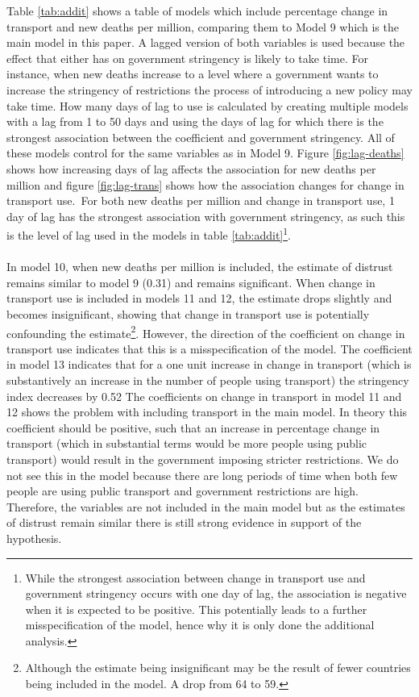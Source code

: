 \documentclass[
  12pt,
]{article}
\begin{document}
Table \ref{tab:addit} shows a table of models which include percentage change in transport and new deaths per million, comparing them to Model 9 which is the main model in this paper. A lagged version of both variables is used because the effect that either has on government stringency is likely to take time. For instance, when new deaths increase to a level where a government wants to increase the stringency of restrictions the process of introducing a new policy may take time. How many days of lag to use is calculated by creating multiple models with a lag from 1 to 50 days and using the days of lag for which there is the strongest association between the coefficient and government stringency. All of these models control for the same variables as in Model 9. Figure \ref{fig:lag-deaths} shows how increasing days of lag affects the association for new deaths per million and figure \ref{fig:lag-trans} shows how the association changes for change in transport use.~For both new deaths per million and change in transport use, 1 day of lag has the strongest association with government stringency, as such this is the level of lag used in the models in table \ref{tab:addit}\footnote{While the strongest association between change in transport use and government stringency occurs with one day of lag, the association is negative when it is expected to be positive. This potentially leads to a further misspecification of the model, hence why it is only done the additional analysis.}.\\
~\\
In model 10, when new deaths per million is included, the estimate of distrust remains similar to model 9 (0.31) and remains significant. When change in transport use is included in models 11 and 12, the estimate drops slightly and becomes insignificant, showing that change in transport use is potentially confounding the estimate\footnote{Although the estimate being insignificant may be the result of fewer countries being included in the model. A drop from 64 to 59.}. However, the direction of the coefficient on change in transport use indicates that this is a misspecification of the model. The coefficient in model 13 indicates that for a one unit increase in change in transport (which is substantively an increase in the number of people using transport) the stringency index decreases by 0.52 The coefficients on change in transport in model 11 and 12 shows the problem with including transport in the main model. In theory this coefficient should be positive, such that an increase in percentage change in transport (which in substantial terms would be more people using public transport) would result in the government imposing stricter restrictions. We do not see this in the model because there are long periods of time when both few people are using public transport and government restrictions are high. Therefore, the variables are not included in the main model but as the estimates of distrust remain similar there is still strong evidence in support of the hypothesis.\\
\end{document}

